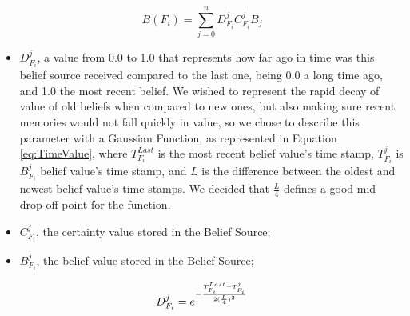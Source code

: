 \begin{equation}
B(F_i) = \sum_{j=0}^{n} D^j_{F_i} C^j_{F_i} B_j 
\label{eq:TrustFeatureBeliefValueCalculation}
\end{equation}

\begin{itemize}
    \item $D^j_{F_i}$, a value from 0.0 to 1.0 that represents how far ago in time was this belief source received compared to the last one, being 0.0 a long time ago, and 1.0 the most recent belief. We wished to represent the rapid decay of value of old beliefs when compared to new ones, but also making sure recent memories would not fall quickly in value, so we chose to describe this parameter with a Gaussian Function, as represented in Equation \ref{eq:TimeValue}, where $T^{Last}_{F_i}$ is the most recent belief value's time stamp, $T^j_{F_i}$ is $B_{F_i}^j$ belief value's time stamp, and $L$ is the difference between the oldest and newest belief value's time stamps. We decided that $\frac{L}{4}$ defines a good mid drop-off point for the function.
    \item $C^j_{F_i}$, the certainty value stored in the Belief Source;
    \item $B^j_{F_i}$, the belief value stored in the Belief Source;
\end{itemize}


\begin{equation}
D^j_{F_i} = e^{-\frac{T^{Last}_{F_i} - T^j_{F_i}}{2(\frac{L}{4})^2}}
\label{eq:TimeValue}
\end{equation}


% 


